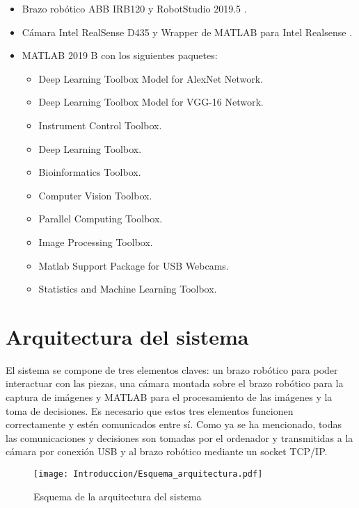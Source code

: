 	\begin{itemize}
	\item Brazo robótico ABB IRB120 \cite{IRB120} y RobotStudio 2019.5 \cite{RobotStudio}.
	\item Cámara Intel RealSense D435 \cite{IntelD435} y Wrapper de MATLAB para Intel Realsense \cite{Wrapper}.
	\item MATLAB 2019 B con los siguientes paquetes:
		\begin{itemize}
			\item Deep Learning Toolbox Model for AlexNet Network.
			\item Deep Learning Toolbox Model for VGG-16 Network.
			\item Instrument Control Toolbox.
			\item Deep Learning Toolbox.
			\item Bioinformatics Toolbox.
			\item Computer Vision Toolbox.
			\item Parallel Computing Toolbox.
			\item Image Processing Toolbox.
			\item Matlab Support Package for USB Webcams.
			\item Statistics and Machine Learning Toolbox.
		\end{itemize}
	\end{itemize}

\section{Arquitectura del sistema}
\label{sec:Arquitectura}
El sistema se compone de tres elementos claves: un brazo robótico para poder interactuar con las piezas, una cámara montada sobre el brazo robótico para la captura de imágenes y MATLAB para el procesamiento de las imágenes y la toma de decisiones. Es necesario que estos tres elementos funcionen correctamente y estén comunicados entre sí. Como ya se ha mencionado, todas las comunicaciones y decisiones son tomadas por el ordenador y transmitidas a la cámara por conexión USB y al brazo robótico mediante un socket TCP/IP.

	\begin{figure}[ht]
		\centering
		\texttt{[image: Introduccion/Esquema\_arquitectura.pdf]}
		\caption{Esquema de la arquitectura del sistema}
		\label{fig:Arq1}
		\vspace{-5pt}
	\end{figure}

